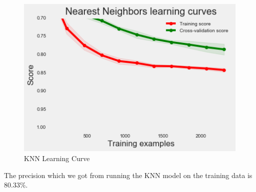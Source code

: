\begin{figure}[H]
\caption{KNN Learning Curve}
\label{5.2}
\centering
\includegraphics[width=\columnwidth]{images/5_2.png}
\end{figure}

The precision which we got from running the KNN model on the training data is 80.33\%.

